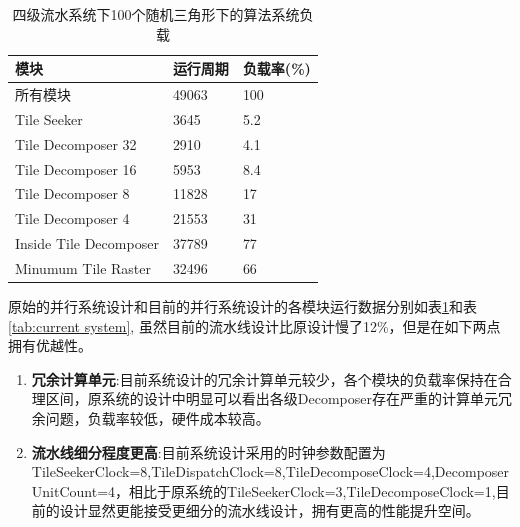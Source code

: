 \begin{table}
    \caption{\label{tab:naive system}四级流水系统下100个随机三角形下的算法系统负载}
    \begin{tabularx}{\linewidth}{|XXX|}
        \hline
        模块 & 运行周期 & 负载率(\%) \\ \hline
        所有模块 & 49063 & 100 \\ \hline
        Tile Seeker & 3645 & 5.2  \\ \hline
        Tile Decomposer 32 & 2910 & 4.1  \\ \hline
        Tile Decomposer 16 & 5953 & 8.4  \\ \hline
        Tile Decomposer 8 & 11828 & 17  \\ \hline
        Tile Decomposer 4 & 21553 & 31  \\ \hline
        Inside Tile Decomposer & 37789 & 77 \\ \hline
        Minumum Tile Raster & 32496 & 66 \\ \hline
    \end{tabularx}
\end{table}

原始的并行系统设计和目前的并行系统设计的各模块运行数据分别如表\ref{tab:naive system}和表\ref{tab:current system}, 虽然目前的流水线设计比原设计慢了12\%，但是在如下两点拥有优越性。

\begin{enumerate}
    \item \textbf{冗余计算单元}:目前系统设计的冗余计算单元较少，各个模块的负载率保持在合理区间，原系统的设计中明显可以看出各级Decomposer存在严重的计算单元冗余问题，负载率较低，硬件成本较高。
    \item \textbf{流水线细分程度更高}:目前系统设计采用的时钟参数配置为TileSeekerClock=8,TileDispatchClock=8,TileDecomposeClock=4,DecomposerUnitCount=4，相比于原系统的TileSeekerClock=3,TileDecomposeClock=1,目前的设计显然更能接受更细分的流水线设计，拥有更高的性能提升空间。
\end{enumerate}